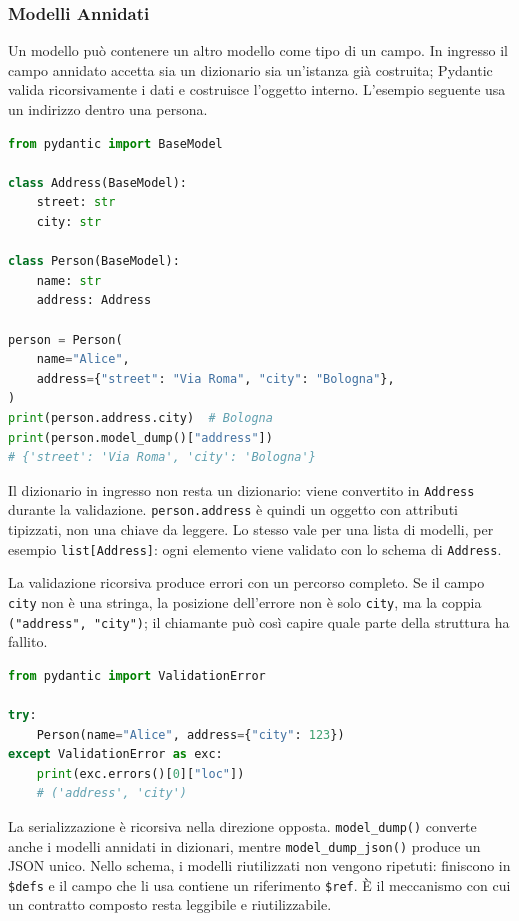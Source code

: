 \documentclass[12pt]{extarticle}
\begin{document}
\subsubsection{Modelli Annidati}

\noindent Un modello può contenere un altro modello come tipo di un campo. In ingresso il campo annidato accetta sia un dizionario sia un'istanza già costruita; Pydantic valida ricorsivamente i dati e costruisce l'oggetto interno. L'esempio seguente usa un indirizzo dentro una persona.

\begin{lstlisting}[language=Python]
from pydantic import BaseModel

class Address(BaseModel):
    street: str
    city: str

class Person(BaseModel):
    name: str
    address: Address

person = Person(
    name="Alice",
    address={"street": "Via Roma", "city": "Bologna"},
)
print(person.address.city)  # Bologna
print(person.model_dump()["address"])
# {'street': 'Via Roma', 'city': 'Bologna'}
\end{lstlisting}

\noindent Il dizionario in ingresso non resta un dizionario: viene convertito in \texttt{Address} durante la validazione. \texttt{person.address} è quindi un oggetto con attributi tipizzati, non una chiave da leggere. Lo stesso vale per una lista di modelli, per esempio \texttt{list[Address]}: ogni elemento viene validato con lo schema di \texttt{Address}.

\noindent La validazione ricorsiva produce errori con un percorso completo. Se il campo \texttt{city} non è una stringa, la posizione dell'errore non è solo \texttt{city}, ma la coppia \texttt{("address", "city")}; il chiamante può così capire quale parte della struttura ha fallito.

\begin{lstlisting}[language=Python]
from pydantic import ValidationError

try:
    Person(name="Alice", address={"city": 123})
except ValidationError as exc:
    print(exc.errors()[0]["loc"])
    # ('address', 'city')
\end{lstlisting}

\noindent La serializzazione è ricorsiva nella direzione opposta. \texttt{model\_dump()} converte anche i modelli annidati in dizionari, mentre \texttt{model\_dump\_json()} produce un JSON unico. Nello schema, i modelli riutilizzati non vengono ripetuti: finiscono in \texttt{\$defs} e il campo che li usa contiene un riferimento \texttt{\$ref}. È il meccanismo con cui un contratto composto resta leggibile e riutilizzabile.
\end{document}
